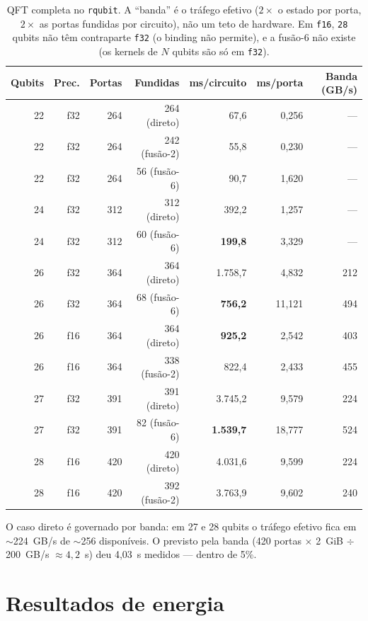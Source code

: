 \documentclass[11pt,a4paper]{article}
\begin{document}
\begin{table}[h]
\centering
\begin{tabular}{rrrrrrr}
\toprule
Qubits & Prec. & Portas & Fundidas & ms/circuito & ms/porta & Banda (GB/s) \\
\midrule
22 & f32 & 264 & 264 (direto) & 67,6 & 0,256 & --- \\
22 & f32 & 264 & 242 (fusão-2) & 55,8 & 0,230 & --- \\
22 & f32 & 264 & 56 (fusão-6) & 90,7 & 1,620 & --- \\
24 & f32 & 312 & 312 (direto) & 392,2 & 1,257 & --- \\
24 & f32 & 312 & 60 (fusão-6) & \textbf{199,8} & 3,329 & --- \\
26 & f32 & 364 & 364 (direto) & 1.758,7 & 4,832 & 212 \\
26 & f32 & 364 & 68 (fusão-6) & \textbf{756,2} & 11,121 & 494 \\
26 & f16 & 364 & 364 (direto) & \textbf{925,2} & 2,542 & 403 \\
26 & f16 & 364 & 338 (fusão-2) & 822,4 & 2,433 & 455 \\
27 & f32 & 391 & 391 (direto) & 3.745,2 & 9,579 & 224 \\
27 & f32 & 391 & 82 (fusão-6) & \textbf{1.539,7} & 18,777 & 524 \\
28 & f16 & 420 & 420 (direto) & 4.031,6 & 9,599 & 224 \\
28 & f16 & 420 & 392 (fusão-2) & 3.763,9 & 9,602 & 240 \\
\bottomrule
\end{tabular}
\caption{QFT completa no \texttt{rqubit}. A ``banda'' é o tráfego efetivo
($2\times$ o estado por porta, $2\times$ as portas fundidas por circuito),
não um teto de hardware. Em \texttt{f16}, \texttt{28} qubits não têm
contraparte \texttt{f32} (o binding não permite), e a fusão-6 não existe
(os kernels de $N$ qubits são só em \texttt{f32}).}
\end{table}

O caso direto é governado por banda: em 27 e 28 qubits o tráfego efetivo fica
em $\sim$224~GB/s de $\sim$256 disponíveis. O previsto pela banda
(420 portas $\times$ 2~GiB $\div$ 200~GB/s $\approx 4{,}2$~s) deu
4,03~s medidos --- dentro de 5\%.

\section{Resultados de energia}
\end{document}
